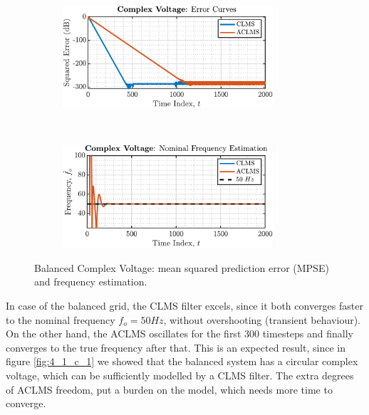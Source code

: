 \begin{enumerate}[label=\alph*), leftmargin=*]
\begin{figure}[h]
    \centering
    \begin{subfigure}{0.49\textwidth}
        \centering
        \includegraphics[height=1.5in]{report/widely-linear-filtering-and-adaptive-spectrum-estimation/complex-LMS-and-widely-linear-modelling/assets/e/balanced_error}
    \end{subfigure}
    ~
    \begin{subfigure}{0.49\textwidth}
        \centering
        \includegraphics[height=1.5in]{report/widely-linear-filtering-and-adaptive-spectrum-estimation/complex-LMS-and-widely-linear-modelling/assets/e/balanced_frequency}
    \end{subfigure}
    \caption{Balanced Complex Voltage: mean squared prediction error (MPSE) and frequency estimation.}
    \label{fig:4_1_e_1}
\end{figure}

In case of the balanced grid, the CLMS filter excels, since it both converges faster to the nominal frequency $f_{o} = 50 Hz$, without overshooting (transient behaviour).
On the other hand, the ACLMS oscillates for the first $300$ timesteps and finally converges to the true frequency after that.
This is an expected result, since in figure \ref{fig:4_1_c_1} we showed that the balanced system has a circular complex voltage, which can be sufficiently modelled by a CLMS filter.
The extra degrees of ACLMS freedom, put a burden on the model, which needs more time to converge.


\end{enumerate}
